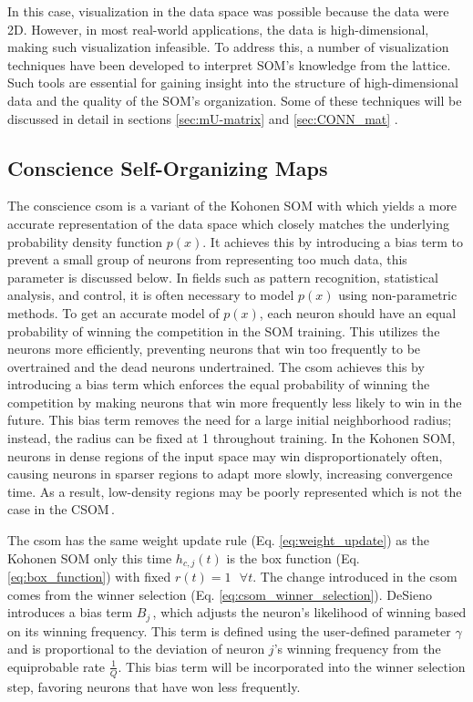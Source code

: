In this case, visualization in the data space was possible because the data were 2D. However, in most real-world applications, the data is high-dimensional, making such visualization infeasible. To address this, a number of visualization techniques have been developed to interpret SOM's knowledge from the lattice. Such tools are essential for gaining insight into the structure of high-dimensional data and the quality of the SOM’s organization. Some of these techniques will be discussed in detail in sections \ref{sec:mU-matrix} and \ref{sec:CONN_mat} .

\subsection{Conscience Self-Organizing Maps}

The conscience \acrfull{csom} \cite{DeSieno88} is a variant of the Kohonen SOM with which yields a more accurate representation of the data space which closely matches the underlying probability density function $p(x)$. It achieves this by introducing a bias term to prevent a small group of neurons from representing too much data, this parameter is discussed below.
In fields such as pattern recognition, statistical analysis, and control, it is often necessary to model $p(x)$ using non-parametric methods. 
To get an accurate model of $p(x)$, each neuron should have an equal probability of winning the competition in the SOM training. This utilizes the neurons more efficiently, preventing neurons that win too frequently to be overtrained and the dead neurons undertrained.
The \acrfull{csom} achieves this by introducing a bias term which enforces the equal probability of winning the competition by making neurons that win more frequently less likely to win in the future. This bias term removes the need for a large initial neighborhood radius; instead, the radius can be fixed at 1 throughout training. In the Kohonen SOM, neurons in dense regions of the input space may win disproportionately often, causing neurons in sparser regions to adapt more slowly, increasing convergence time. As a result, low-density regions may be poorly represented which is not the case in the CSOM\,\cite{DeSieno88}.

The \acrshort{csom} has the same weight update rule (Eq. \ref{eq:weight_update}) as the Kohonen SOM only this time $h_{c,j}(t)$ is the box function (Eq. \ref{eq:box_function}) with fixed $r(t) = 1 \text{ }\forall t$. The change introduced in the \acrshort{csom} comes from the winner selection (Eq. \ref{eq:csom_winner_selection}). DeSieno introduces a bias term $B_j$\,\cite{DeSieno88}, which adjusts the neuron’s likelihood of winning based on its winning frequency. This term is defined using the user-defined parameter $\gamma$ and is proportional to the deviation of neuron $j$'s winning frequency from the equiprobable rate $\frac{1}{Q}$. This bias term will be incorporated into the winner selection step, favoring neurons that have won less frequently.

